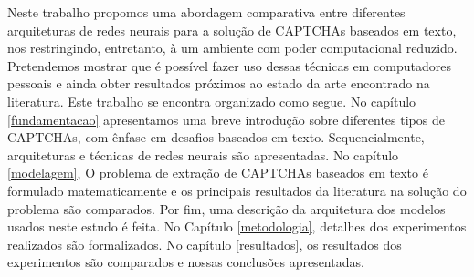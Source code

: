 Neste trabalho propomos uma abordagem comparativa entre diferentes arquiteturas de redes neurais para a solução de CAPTCHAs baseados em texto, nos restringindo, entretanto, à um ambiente com poder computacional reduzido. Pretendemos mostrar que é possível fazer uso dessas técnicas em computadores pessoais e ainda obter resultados próximos ao estado da arte encontrado na literatura. Este trabalho se encontra organizado como segue. No capítulo \ref{fundamentacao} apresentamos uma breve introdução sobre diferentes tipos de CAPTCHAs, com ênfase em desafios baseados em texto. Sequencialmente, arquiteturas e técnicas de redes neurais são apresentadas. No capítulo \ref{modelagem}, O problema de extração de CAPTCHAs baseados em texto é formulado matematicamente e os principais resultados da literatura na solução do problema são comparados. Por fim, uma descrição da arquitetura dos modelos usados neste estudo é feita. No Capítulo \ref{metodologia}, detalhes dos experimentos realizados são formalizados. No capítulo \ref{resultados}, os resultados dos experimentos são comparados e nossas conclusões apresentadas. 

